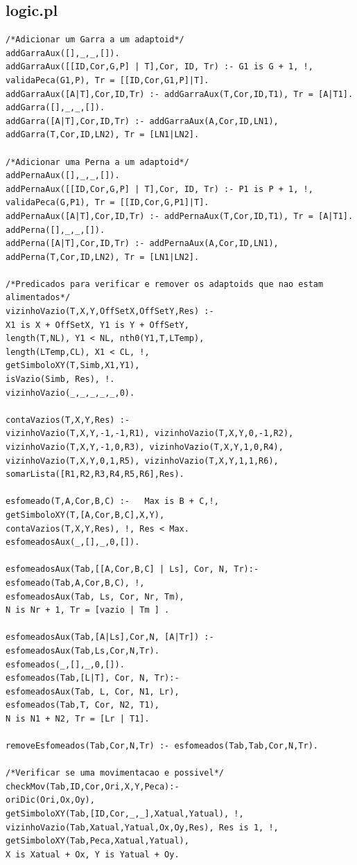 \documentclass[a4paper]{article}
\begin{document}
\subsection{logic.pl}
\begin{lstlisting}
/*Adicionar um Garra a um adaptoid*/
addGarraAux([],_,_,[]).
addGarraAux([[ID,Cor,G,P] | T],Cor, ID, Tr) :- G1 is G + 1, !, validaPeca(G1,P), Tr = [[ID,Cor,G1,P]|T].
addGarraAux([A|T],Cor,ID,Tr) :- addGarraAux(T,Cor,ID,T1), Tr = [A|T1].
addGarra([],_,_,[]).
addGarra([A|T],Cor,ID,Tr) :- addGarraAux(A,Cor,ID,LN1), addGarra(T,Cor,ID,LN2), Tr = [LN1|LN2].

/*Adicionar uma Perna a um adaptoid*/
addPernaAux([],_,_,[]).
addPernaAux([[ID,Cor,G,P] | T],Cor, ID, Tr) :- P1 is P + 1, !, validaPeca(G,P1), Tr = [[ID,Cor,G,P1]|T].
addPernaAux([A|T],Cor,ID,Tr) :- addPernaAux(T,Cor,ID,T1), Tr = [A|T1].
addPerna([],_,_,[]).
addPerna([A|T],Cor,ID,Tr) :- addPernaAux(A,Cor,ID,LN1), addPerna(T,Cor,ID,LN2), Tr = [LN1|LN2].

/*Predicados para verificar e remover os adaptoids que nao estam alimentados*/
vizinhoVazio(T,X,Y,OffSetX,OffSetY,Res) :-
X1 is X + OffSetX, Y1 is Y + OffSetY,
length(T,NL), Y1 < NL, nth0(Y1,T,LTemp),
length(LTemp,CL), X1 < CL, !,
getSimboloXY(T,Simb,X1,Y1),
isVazio(Simb, Res), !.
vizinhoVazio(_,_,_,_,_,0).

contaVazios(T,X,Y,Res) :-
vizinhoVazio(T,X,Y,-1,-1,R1), vizinhoVazio(T,X,Y,0,-1,R2),
vizinhoVazio(T,X,Y,-1,0,R3), vizinhoVazio(T,X,Y,1,0,R4),
vizinhoVazio(T,X,Y,0,1,R5), vizinhoVazio(T,X,Y,1,1,R6),
somarLista([R1,R2,R3,R4,R5,R6],Res).

esfomeado(T,A,Cor,B,C) :-   Max is B + C,!,
getSimboloXY(T,[A,Cor,B,C],X,Y),
contaVazios(T,X,Y,Res), !, Res < Max.
esfomeadosAux(_,[],_,0,[]).

esfomeadosAux(Tab,[[A,Cor,B,C] | Ls], Cor, N, Tr):-
esfomeado(Tab,A,Cor,B,C), !,
esfomeadosAux(Tab, Ls, Cor, Nr, Tm),
N is Nr + 1, Tr = [vazio | Tm ] .

esfomeadosAux(Tab,[A|Ls],Cor,N, [A|Tr]) :- esfomeadosAux(Tab,Ls,Cor,N,Tr).
esfomeados(_,[],_,0,[]).
esfomeados(Tab,[L|T], Cor, N, Tr):-
esfomeadosAux(Tab, L, Cor, N1, Lr),
esfomeados(Tab,T, Cor, N2, T1),
N is N1 + N2, Tr = [Lr | T1].

removeEsfomeados(Tab,Cor,N,Tr) :- esfomeados(Tab,Tab,Cor,N,Tr).

/*Verificar se uma movimentacao e possivel*/
checkMov(Tab,ID,Cor,Ori,X,Y,Peca):-
oriDic(Ori,Ox,Oy),
getSimboloXY(Tab,[ID,Cor,_,_],Xatual,Yatual), !,
vizinhoVazio(Tab,Xatual,Yatual,Ox,Oy,Res), Res is 1, !,
getSimboloXY(Tab,Peca,Xatual,Yatual),
X is Xatual + Ox, Y is Yatual + Oy.


\end{lstlisting}
\end{document}
